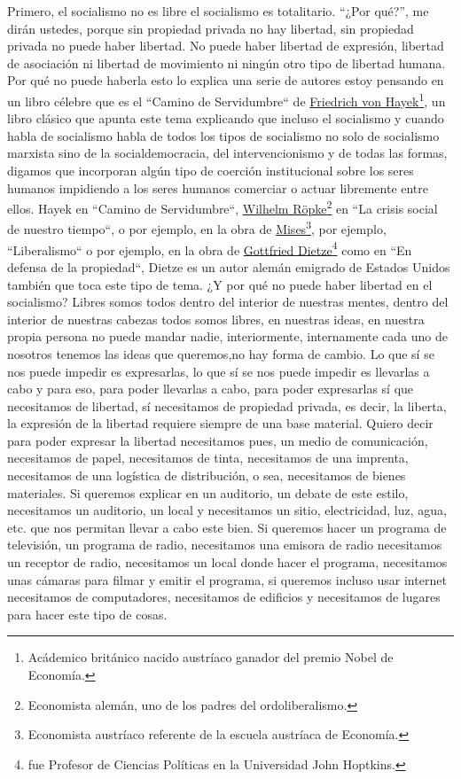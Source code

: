 Primero, el socialismo no es libre el socialismo es totalitario. \enquote{¿Por qué?}, me dirán ustedes, porque sin propiedad privada no hay libertad, sin propiedad privada no puede haber libertad. No puede haber libertad de expresión, libertad de asociación ni libertad de movimiento ni ningún otro tipo de libertad humana. Por qué no puede haberla esto lo explica una serie de autores estoy pensando en un libro célebre que es el ``Camino de Servidumbre``\cite{hayek1944road} de \href{https://en.wikipedia.org/wiki/Friedrich_Hayek}{Friedrich von Hayek}\footnote{Acádemico británico nacido austríaco ganador del premio Nobel de Economía.}, un libro clásico que apunta este tema explicando que incluso el socialismo y cuando habla de socialismo habla de todos los tipos de socialismo no solo de socialismo marxista sino de la socialdemocracia, del intervencionismo y de todas las formas, digamos que incorporan algún tipo de coerción institucional sobre los seres humanos impidiendo a los seres humanos comerciar o actuar libremente entre ellos. Hayek en ``Camino de Servidumbre``, \href{https://en.wikipedia.org/wiki/Wilhelm_R%C3%B6pke}{Wilhelm Röpke}\footnote{Economista alemán, uno de los padres del ordoliberalismo.} en ``La crisis social de nuestro tiempo``\cite{röpke1950social}, o por ejemplo, en la obra de \href{https://en.wikipedia.org/wiki/Ludwig_von_Mises}{Mises}\footnote{Economista austríaco referente de la escuela austríaca de Economía.}, por ejemplo, ``Liberalismo``\cite{vonmises1995liberalism} o por ejemplo, en la obra de \href{https://mises.org/mises-daily/who-was-gottfried-dietze}{Gottfried Dietze}\footnote{fue Profesor de Ciencias Políticas en la Universidad John Hoptkins.} como en ``En defensa de la propiedad``\cite{dietze1963defense}, Dietze es un autor alemán emigrado de Estados Unidos también que toca este tipo de tema. ¿Y por qué no puede haber libertad en el socialismo? Libres somos todos dentro del interior de nuestras mentes, dentro del interior de nuestras cabezas todos somos libres, en nuestras ideas, en nuestra propia persona no puede mandar nadie, interiormente, internamente cada uno de nosotros tenemos las ideas que queremos,no hay forma de cambio. Lo que sí se nos puede impedir es expresarlas, lo que sí se nos puede impedir es llevarlas a cabo y para eso, para poder llevarlas a cabo, para poder expresarlas sí que necesitamos de libertad, sí necesitamos de propiedad privada, es decir, la liberta, la expresión de la libertad requiere siempre de una base material. Quiero decir para poder expresar la libertad necesitamos pues, un medio de comunicación, necesitamos de papel, necesitamos de tinta, necesitamos de una imprenta, necesitamos de una logística de distribución, o sea, necesitamos de bienes materiales. Si queremos explicar en un auditorio, un debate de este estilo, necesitamos un auditorio, un local y necesitamos un sitio, electricidad, luz, agua, etc. que nos permitan llevar a cabo este bien. Si queremos hacer un programa de televisión, un programa de radio, necesitamos una emisora de radio necesitamos un receptor de radio, necesitamos un local donde hacer el programa, necesitamos unas cámaras para filmar y emitir el programa, si queremos incluso usar internet necesitamos de computadores,
necesitamos de edificios y necesitamos de lugares para hacer este tipo de cosas.

